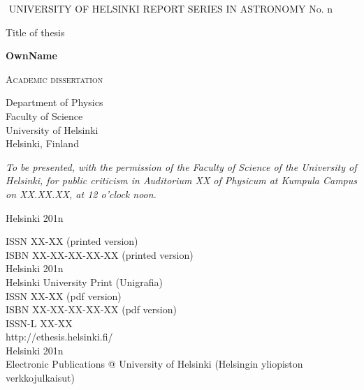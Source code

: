 \documentclass[a4paper,11pt,english]{report}
\begin{document}
\begin{titlepage}
$ $
UNIVERSITY OF HELSINKI \hspace{2cm} REPORT SERIES IN ASTRONOMY
\vspace{0.9cm}
\center
No. n

\vspace{4cm}

\Huge{\textsf{Title of thesis}}
\vspace{2em}

\Large{
    \textsf{\textbf{OwnName}\\
        }
    }
\vspace{2em}
\Large{
    \textsc{Academic dissertation
        \\
        }
        \vspace{2em}

         Department of Physics\\
         Faculty of Science\\
         University of Helsinki\\
         Helsinki, Finland\\

             \vspace{5em}

\normalsize{
  \textit{To be presented, with the permission of the Faculty of Science of
the University of Helsinki, for public criticism in Auditorium XX of Physicum 
at Kumpula Campus on XX.XX.XX, at 12 o'clock noon.}}

\vspace{1.2em}

\normalsize{Helsinki 201n}


}

\end{titlepage}

\begin{titlepage}
\textbf{}
\vspace{39.5em}
\center
\noindent ISSN XX-XX (printed version)\\
ISBN XX-XX-XX-XX-XX (printed version)\\
Helsinki 201n\\
Helsinki University Print (Unigrafia)\\
\vspace{0.7em}
ISSN XX-XX (pdf version)\\
ISBN XX-XX-XX-XX-XX (pdf version)\\
ISSN-L XX-XX\\
http://ethesis.helsinki.fi/\\
Helsinki 201n\\
Electronic Publications @ University of Helsinki (Helsingin yliopiston
verkkojulkaisut)
\end{titlepage}
\end{document}

